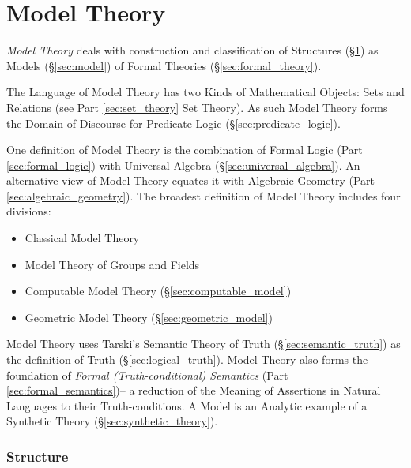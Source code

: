 \part{Model Theory}\label{sec:model_theory}\cite{hodges97}

\emph{Model Theory} deals with construction and classification of
Structures (\S\ref{sec:structure}) as Models (\S\ref{sec:model}) of
Formal Theories (\S\ref{sec:formal_theory}).

The Language of Model Theory has two Kinds of Mathematical Objects:
Sets and Relations (see Part \ref{sec:set_theory} Set Theory). As such
Model Theory forms the Domain of Discourse for Predicate Logic
(\S\ref{sec:predicate_logic}).

One definition of Model Theory is the combination of Formal Logic
(Part \ref{sec:formal_logic}) with Universal Algebra
(\S\ref{sec:universal_algebra}). An alternative view of Model Theory
equates it with Algebraic Geometry (Part
\ref{sec:algebraic_geometry}). The broadest definition of Model Theory
includes four divisions:
\begin{itemize}
  \item Classical Model Theory
  \item Model Theory of Groups and Fields
  \item Computable Model Theory (\S\ref{sec:computable_model})
  \item Geometric Model Theory (\S\ref{sec:geometric_model})
\end{itemize}

Model Theory uses Tarski's Semantic Theory of Truth
(\S\ref{sec:semantic_truth}) as the definition of Truth
(\S\ref{sec:logical_truth}). Model Theory also forms the foundation of
\emph{Formal (Truth-conditional) Semantics} (Part
\ref{sec:formal_semantics})-- a reduction of the Meaning of Assertions
in Natural Languages to their Truth-conditions. A Model is an Analytic
example of a Synthetic Theory (\S\ref{sec:synthetic_theory}).
\cite{shulman15}



\section{Structure}\label{sec:structure}

